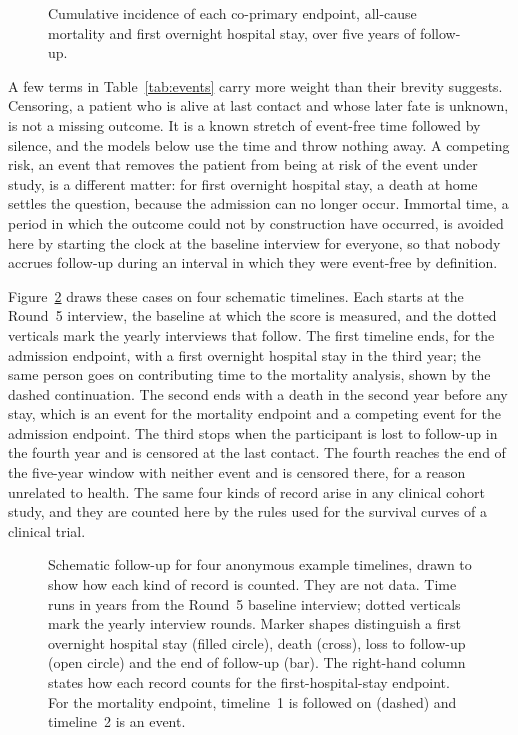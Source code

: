\begin{figure}[htbp]
\centering
{}
\captionsetup{justification=justified, width=\linewidth}
\caption{Cumulative incidence of each co-primary endpoint, all-cause mortality and first overnight hospital stay, over five years of follow-up.}
\label{fig:km_overall}
\end{figure}

A few terms in Table~\ref{tab:events} carry more weight than their brevity suggests. Censoring, a patient who is alive at last contact and whose later fate is unknown, is not a missing outcome. It is a known stretch of event-free time followed by silence, and the models below use the time and throw nothing away. A competing risk, an event that removes the patient from being at risk of the event under study, is a different matter: for first overnight hospital stay, a death at home settles the question, because the admission can no longer occur. Immortal time, a period in which the outcome could not by construction have occurred, is avoided here by starting the clock at the baseline interview for everyone, so that nobody accrues follow-up during an interval in which they were event-free by definition.

Figure~\ref{fig:prog-followup} draws these cases on four schematic timelines. Each starts at the Round~5 interview, the baseline at which the score is measured, and the dotted verticals mark the yearly interviews that follow. The first timeline ends, for the admission endpoint, with a first overnight hospital stay in the third year; the same person goes on contributing time to the mortality analysis, shown by the dashed continuation. The second ends with a death in the second year before any stay, which is an event for the mortality endpoint and a competing event for the admission endpoint. The third stops when the participant is lost to follow-up in the fourth year and is censored at the last contact. The fourth reaches the end of the five-year window with neither event and is censored there, for a reason unrelated to health. The same four kinds of record arise in any clinical cohort study, and they are counted here by the rules used for the survival curves of a clinical trial.

\begin{figure}[htbp]
\centering

\captionsetup{justification=justified, width=\linewidth}
\caption{Schematic follow-up for four anonymous example timelines, drawn to show how each kind of record is counted. They are not data. Time runs in years from the Round~5 baseline interview; dotted verticals mark the yearly interview rounds. Marker shapes distinguish a first overnight hospital stay (filled circle), death (cross), loss to follow-up (open circle) and the end of follow-up (bar). The right-hand column states how each record counts for the first-hospital-stay endpoint. For the mortality endpoint, timeline~1 is followed on (dashed) and timeline~2 is an event.}
\label{fig:prog-followup}
\end{figure}

